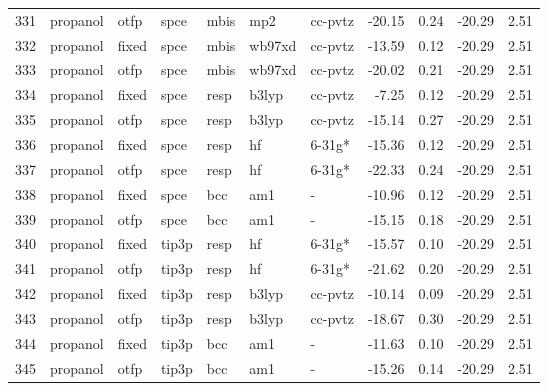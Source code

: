 \begin{tabular}{lllllllrrrr}
331 &                      propanol &   otfp &   spce &   mbis &     mp2 &      cc-pvtz &      -20.15 &     0.24 &      -20.29 &      2.51 \\
332 &                      propanol &  fixed &   spce &   mbis &  wb97xd &      cc-pvtz &      -13.59 &     0.12 &      -20.29 &      2.51 \\
333 &                      propanol &   otfp &   spce &   mbis &  wb97xd &      cc-pvtz &      -20.02 &     0.21 &      -20.29 &      2.51 \\
334 &                      propanol &  fixed &   spce &   resp &   b3lyp &      cc-pvtz &       -7.25 &     0.12 &      -20.29 &      2.51 \\
335 &                      propanol &   otfp &   spce &   resp &   b3lyp &      cc-pvtz &      -15.14 &     0.27 &      -20.29 &      2.51 \\
336 &                      propanol &  fixed &   spce &   resp &      hf &       6-31g* &      -15.36 &     0.12 &      -20.29 &      2.51 \\
337 &                      propanol &   otfp &   spce &   resp &      hf &       6-31g* &      -22.33 &     0.24 &      -20.29 &      2.51 \\
338 &                      propanol &  fixed &   spce &    bcc &     am1 &            - &      -10.96 &     0.12 &      -20.29 &      2.51 \\
339 &                      propanol &   otfp &   spce &    bcc &     am1 &            - &      -15.15 &     0.18 &      -20.29 &      2.51 \\
340 &                      propanol &  fixed &  tip3p &   resp &      hf &       6-31g* &      -15.57 &     0.10 &      -20.29 &      2.51 \\
341 &                      propanol &   otfp &  tip3p &   resp &      hf &       6-31g* &      -21.62 &     0.20 &      -20.29 &      2.51 \\
342 &                      propanol &  fixed &  tip3p &   resp &   b3lyp &      cc-pvtz &      -10.14 &     0.09 &      -20.29 &      2.51 \\
343 &                      propanol &   otfp &  tip3p &   resp &   b3lyp &      cc-pvtz &      -18.67 &     0.30 &      -20.29 &      2.51 \\
344 &                      propanol &  fixed &  tip3p &    bcc &     am1 &            - &      -11.63 &     0.10 &      -20.29 &      2.51 \\
345 &                      propanol &   otfp &  tip3p &    bcc &     am1 &            - &      -15.26 &     0.14 &      -20.29 &      2.51 \\

\end{tabular}
